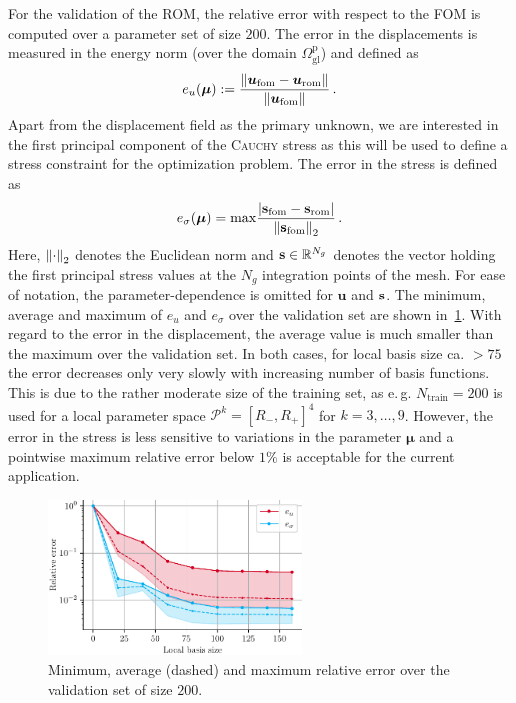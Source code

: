\documentclass[a4paper]{eccomas_paper-2024}
\makeatletter
\newcommand{\eg}{e.\,g.\@\xspace}
\newcommand{\m}{\bm\mu}
\newcommand{\gl}{\mathrm{gl}}
\newcommand{\p}{\mathrm{p}}
\newcommand{\fom}{\mathrm{fom}}
\newcommand{\rom}{\mathrm{rom}}
\newcommand{\train}{\mathrm{train}}
\makeatother
\begin{document}
For the validation of the ROM, the relative error with respect to the FOM is computed over a parameter set of size $200$.
The error in the displacements is measured in the energy norm (over the domain $\varOmega^{\p}_{\gl}$) and defined as
\begin{equation}
    e_u(\m) := \frac{\norm{\bm{u}_{\fom} - \bm{u}_{\rom}}}{\norm{\bm{u}_{\fom}}}\,.
    \label{eq:error_u}
\end{equation}
Apart from the displacement field as the primary unknown, we are interested in the first principal component of the \textsc{Cauchy} stress as this will be used to define a stress constraint for the optimization problem.
The error in the stress is defined as
\begin{equation}
    e_{\sigma}(\m) = \mathrm{max} \frac{\vert\vb{s}_{\fom} - \vb{s}_{\rom}\vert}{\norm{\vb{s}_{\fom}}_2}\,.
    \label{eq:error_sigma}
\end{equation}
Here, $\norm{\cdot}_2$ denotes the Euclidean norm and $\vb{s}\in\mathbb{R}^{N_g}$ denotes the vector holding the first principal stress values at the $N_g$ integration points of the mesh.
For ease of notation, the parameter-dependence is omitted for $\bm{u}$ and $\vb{s}$.
The minimum, average and maximum of $e_u$ and $e_{\sigma}$ over the validation set are shown in~\cref{fig:relerr}.
With regard to the error in the displacement, the average value is much smaller than the maximum over the validation set.
In both cases, for local basis size ca. $> 75$ the error decreases only very slowly with increasing number of basis functions.
This is due to the rather moderate size of the training set, as \eg{} $N_{\train}=200$ is used for a local parameter space $\mathcal{P}^k=[R_{-}, R_{+}]^4$ for $k=3, \ldots, 9$.
However, the error in the stress is less sensitive to variations in the parameter $\m$ and a pointwise maximum relative error below $1\%$ is acceptable for the current application.

\begin{figure}
    \begin{center}
        \includegraphics[width=0.6\textwidth]{relerr.pdf}
    \end{center}
    \caption{Minimum, average (dashed) and maximum relative error over the validation set of size $200$.}\label{fig:relerr}
\end{figure}
\end{document}
